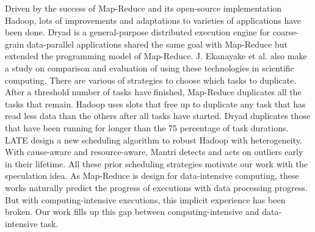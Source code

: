 Driven by the success of Map-Reduce \cite{dean} and its open-source implementation Hadoop, lots of improvements \cite{Zaharia:2008:IMP:1855741.1855744} \cite{Ananthanarayanan:2010:ROM:1924943.1924962} and adaptations \cite{Srirama:2012:ASC:2304777.2304882} to varieties of applications have been done. Dryad \cite{Isard:2007:DDD:1272998.1273005} is a general-purpose distributed execution engine for coarse-grain data-parallel applications shared the same goal with Map-Reduce but extended the programming model of Map-Reduce. J. Ekanayake et al. \cite{Ekanayake:2011:CTB:1990761.1990858} also make a study on comparison and evaluation of using these technologies in scientific computing. There are various of strategies to choose which tasks to duplicate. After a threshold number of tasks havefinished, Map-Reduce duplicates all the tasks that remain. Hadoop uses slots that free up to duplicate any task that has read less data than the others after all tasks have started. Dryad duplicates those that have been running for longer than the 75 percentage of task durations. LATE \cite{Zaharia:2008:IMP:1855741.1855744} design a new scheduling algorithm to robust Hadoop with heterogeneity. With cause-aware and resource-aware, Mantri \cite{Ananthanarayanan:2010:ROM:1924943.1924962} detects and acts on outliers early in their lifetime. All these prior scheduling strategies motivate our work with the speculation idea. As Map-Reduce is design for data-intensive computing, these works naturally predict the progress of executions with data processing progress. But with computing-intensive executions, this implicit experience has been broken. Our work fills up this gap between computing-intensive and data-intensive task.


